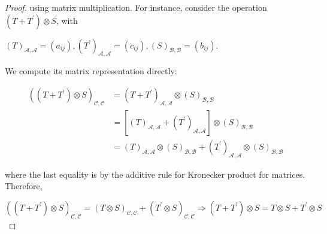 \begin{proof}
using matrix multiplication. For instance, consider the operation \(\left( {T + {T}^{\prime }}\right)  \otimes  S\), with

\({\left( T\right) }_{\mathcal{A},\mathcal{A}} = \left( {a}_{ij}\right) ,{\left( {T}^{\prime }\right) }_{\mathcal{A},\mathcal{A}} = \left( {c}_{ij}\right) ,{\left( S\right) }_{\mathcal{B},\mathcal{B}} = \left( {b}_{ij}\right).\)

We compute its matrix representation directly:

\begin{align*}
{\left( \left( T + {T}^{\prime }\right)  \otimes  S\right) }_{\mathcal{C},\mathcal{C}} &= {\left( T + {T}^{\prime }\right) }_{\mathcal{A},\mathcal{A}} \otimes  {\left( S\right) }_{\mathcal{B},\mathcal{B}}\\
&= \left\lbrack  {{\left( T\right) }_{\mathcal{A},\mathcal{A}} + {\left( {T}^{\prime }\right) }_{\mathcal{A},\mathcal{A}}}\right\rbrack   \otimes  {\left( S\right) }_{\mathcal{B},\mathcal{B}}\\
&= {\left( T\right) }_{\mathcal{A},\mathcal{A}} \otimes  {\left( S\right) }_{\mathcal{B},\mathcal{B}} + {\left( {T}^{\prime }\right) }_{\mathcal{A},\mathcal{A}} \otimes  {\left( S\right) }_{\mathcal{B},\mathcal{B}}
\end{align*}

where the last equality is by the additive rule for Kronecker product for matrices. Therefore,

\[
{\left( \left( T + {T}^{\prime }\right)  \otimes  S\right) }_{\mathcal{C},\mathcal{C}} = {\left( T \otimes  S\right) }_{\mathcal{C},\mathcal{C}} + {\left( {T}^{\prime } \otimes  S\right) }_{\mathcal{C},\mathcal{C}} \Rightarrow  \left( {T + {T}^{\prime }}\right)  \otimes  S = T \otimes  S + {T}^{\prime } \otimes  S
\]
\end{proof} 

